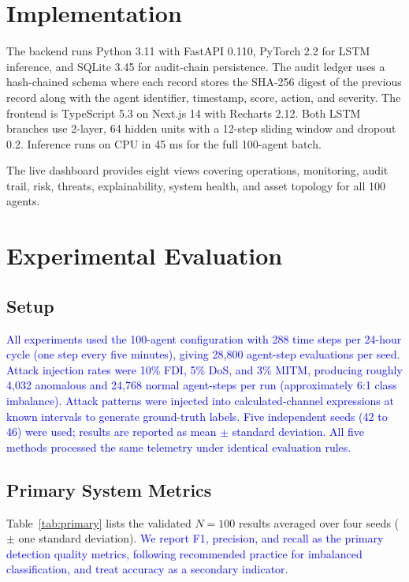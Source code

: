 \documentclass[conference,a4paper]{IEEEtran}
\begin{document}
\section{Implementation}

The backend runs Python 3.11 with FastAPI 0.110, PyTorch 2.2 for LSTM inference, and SQLite 3.45 for audit-chain persistence. The audit ledger uses a hash-chained schema where each record stores the SHA-256 digest of the previous record along with the agent identifier, timestamp, score, action, and severity. The frontend is TypeScript 5.3 on Next.js 14 with Recharts 2.12. Both LSTM branches use 2-layer, 64 hidden units with a 12-step sliding window and dropout 0.2. Inference runs on CPU in 45 ms for the full 100-agent batch.

The live dashboard provides eight views covering operations, monitoring, audit trail, risk, threats, explainability, system health, and asset topology for all 100 agents.

\section{Experimental Evaluation}

\subsection{Setup}

\textcolor{blue}{All experiments used the 100-agent configuration with 288 time steps per 24-hour cycle (one step every five minutes), giving 28,800 agent-step evaluations per seed. Attack injection rates were 10\% FDI, 5\% DoS, and 3\% MITM, producing roughly 4,032 anomalous and 24,768 normal agent-steps per run (approximately 6:1 class imbalance). Attack patterns were injected into calculated-channel expressions at known intervals to generate ground-truth labels. Five independent seeds (42 to 46) were used; results are reported as mean $\pm$ standard deviation. All five methods processed the same telemetry under identical evaluation rules.}

\subsection{Primary System Metrics}

Table~\ref{tab:primary} lists the validated $N=100$ results averaged over four seeds ($\pm$ one standard deviation). \textcolor{blue}{We report F1, precision, and recall as the primary detection quality metrics, following recommended practice for imbalanced classification, and treat accuracy as a secondary indicator.}
\end{document}
